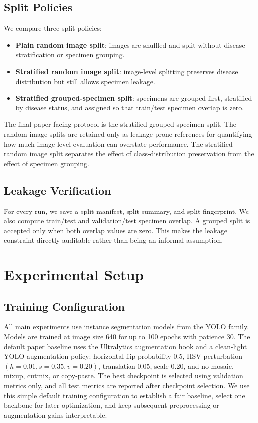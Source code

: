 \documentclass{svproc}
\begin{document}
\subsection{Split Policies}

We compare three split policies:
\begin{itemize}
\item \textbf{Plain random image split}: images are shuffled and split
without disease stratification or specimen grouping.
\item \textbf{Stratified random image split}: image-level splitting
preserves disease distribution but still allows specimen leakage.
\item \textbf{Stratified grouped-specimen split}: specimens are grouped
first, stratified by disease status, and assigned so that train/test
specimen overlap is zero.
\end{itemize}

The final paper-facing protocol is the stratified grouped-specimen split.
The random image splits are retained only as leakage-prone references
for quantifying how much image-level evaluation can overstate
performance. The stratified random image split separates the effect of
class-distribution preservation from the effect of specimen grouping.

\subsection{Leakage Verification}

For every run, we save a split manifest, split summary, and split
fingerprint. We also compute train/test and validation/test specimen
overlap. A grouped split is accepted only when both overlap values are
zero. This makes the leakage constraint directly auditable rather than
being an informal assumption.

\section{Experimental Setup}

\subsection{Training Configuration}

All main experiments use instance segmentation models from the YOLO
family. Models are trained at image size 640 for
up to 100 epochs with patience 30. The default paper baseline uses the
Ultralytics augmentation hook and a clean-light YOLO augmentation policy:
horizontal flip probability 0.5, HSV perturbation
$(h=0.01,s=0.35,v=0.20)$, translation 0.05, scale 0.20, and no mosaic,
mixup, cutmix, or copy-paste. The best checkpoint is selected using
validation metrics only, and all test metrics are reported after
checkpoint selection. We use this simple default training configuration
to establish a fair baseline, select one backbone for later optimization,
and keep subsequent preprocessing or augmentation gains interpretable.
\end{document}
